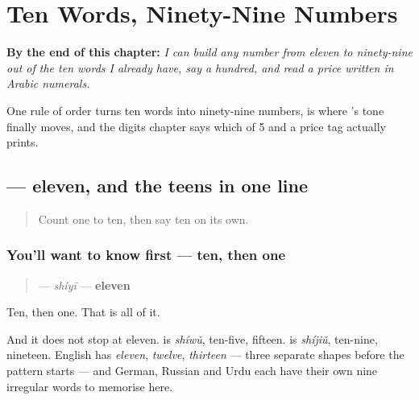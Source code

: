 
\chapter{Ten Words, Ninety-Nine Numbers}
\label{ch:zh-decimal}

\begin{chapteropening}
\textbf{By the end of this chapter:} \emph{I can build any number from eleven to ninety-nine out of the ten words I already have, say a hundred, and read a price written in Arabic numerals.}

One rule of order turns ten words into ninety-nine numbers,  is where 's tone finally moves, and the digits chapter says which of 5 and  a price tag actually prints.
\end{chapteropening}

\section[\texorpdfstring{\zh{十一} (shíyī)}{十一 (shíyī)}]{ — eleven, and the teens in one line}

\label{lesson:ZH-C21-shiyi}



\begin{quote}
Count one to ten, then say ten on its own.
\end{quote}

\subsection*{You'll want to know first — ten, then one}
\begin{quote}
\textbf{} — \emph{shíyī} — \textbf{eleven}
\end{quote}

Ten, then one. That is all of it.

And it does not stop at eleven. \textbf{} is \emph{shíwǔ}, ten-five, fifteen. \textbf{} is \emph{shíjiǔ}, ten-nine, nineteen. English has \emph{eleven}, \emph{twelve}, \emph{thirteen} — three separate shapes before the pattern starts — and German, Russian and Urdu each have their own nine irregular words to memorise here.

